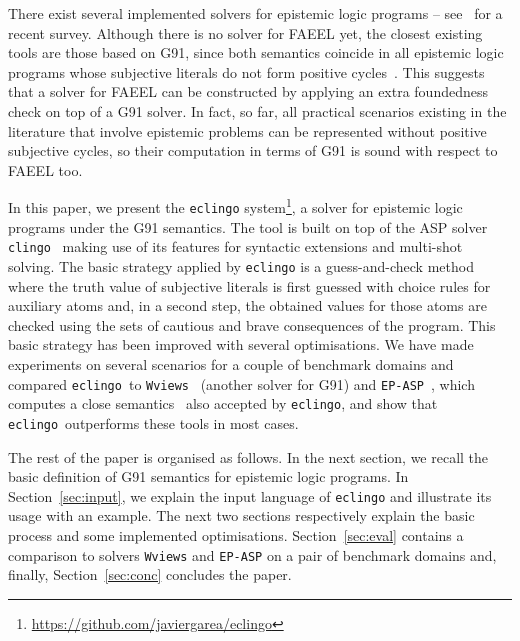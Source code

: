 \documentclass{new_tlp}
\def\eclingo{{\tt eclingo}}
\def\wviews{{\tt Wviews}}
\def\clingo{{\tt clingo}}
\def\wviews{{\tt Wviews}}
\def\EPASP{{\tt EP-ASP}}
\begin{document}
There exist several implemented solvers for epistemic logic programs -- see~\cite{leckah18} for a recent survey.
%
Although there is no solver for FAEEL yet, the closest existing tools are those based on G91, since both semantics coincide in all epistemic logic programs whose subjective literals do not form positive cycles~\cite{fandinno19}.
%
This suggests that a solver for FAEEL can be constructed by applying an extra foundedness check on top of a G91 solver.
%
In fact, so far, all practical scenarios existing in the literature that involve epistemic problems can be represented without positive subjective cycles, so their computation in terms of G91 is sound with respect to FAEEL too.

In this paper, we present the \eclingo{} system\footnote{\url{https://github.com/javiergarea/eclingo}}, a solver for epistemic logic programs under the G91 semantics.
%
The tool is built on top of the ASP solver \clingo~\cite{gekakasc17a}
making use of its features for syntactic extensions and multi-shot solving.
%
The basic strategy applied by \eclingo{} is a guess-and-check method where the truth value of subjective literals is first guessed with choice rules for auxiliary atoms and, in a second step, the obtained values for those atoms are checked using the sets of cautious and brave consequences of the program.
%
This basic strategy has been improved with several optimisations.
%
We have made experiments on several scenarios for a couple of benchmark domains and compared \eclingo\ to
\wviews~\cite{Kelly07} (another solver for G91) and \EPASP~\cite{SLKL17},
which computes a close semantics~\cite{kawabagezh15} also accepted by \eclingo{},
and show that \eclingo\ outperforms these tools in most cases.

The rest of the paper is organised as follows. 
%
In the next section, we recall the basic definition of G91 semantics for epistemic logic programs.
%
In Section~\ref{sec:input}, we explain the input language of \eclingo{} and illustrate its usage with an example.
%
The next two sections respectively explain the basic process and some implemented optimisations.
%
Section~\ref{sec:eval} contains a comparison to solvers \wviews{} and \EPASP{} on a pair of benchmark domains and, finally, Section~\ref{sec:conc} concludes the paper.



\end{document}
